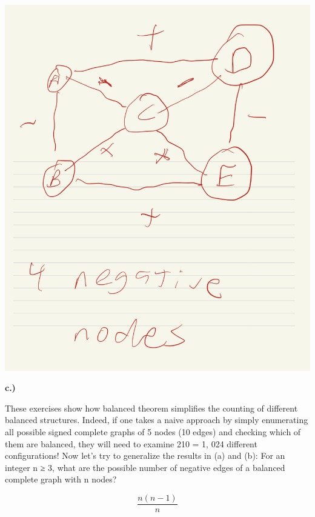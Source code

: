 \documentclass[
]{article}
\begin{document}
\includegraphics{graph8.jpg}

\textbf{c.)}

These exercises show how balanced theorem simplifies the counting of
different balanced structures. Indeed, if one takes a naive approach by
simply enumerating all possible signed complete graphs of 5 nodes (10
edges) and checking which of them are balanced, they will need to
examine 210 = 1, 024 different configurations! Now let's try to
generalize the results in (a) and (b): For an integer n ≥ 3, what are
the possible number of negative edges of a balanced complete graph with
n nodes?

\[\frac{n(n-1)}{n}\]
\end{document}
